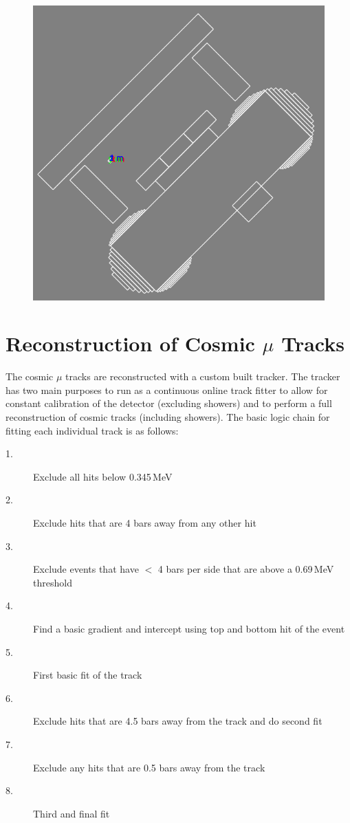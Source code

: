 \documentclass[12pt,a4paper]{article}
\begin{document}
\begin{figure}[H]
 \centering
 \includegraphics[width=0.5\linewidth]{wylfaReactorBuildings/WylfaTopDownGeomRedoCut.png}
  \label{fig:WylfaTopDownG4}
\end{figure}

\section{Reconstruction of Cosmic $\mu$ Tracks} \label{sec:ReconstructionOfCosmicMuTracks}
The cosmic $\mu$ tracks are reconstructed with a custom built tracker. The tracker has two main purposes to run as a continuous online track fitter to allow for constant calibration of the detector (excluding showers) and to perform a full reconstruction of cosmic tracks (including showers). The basic logic chain for fitting each individual track is as follows: 
\begin{description}
  \item[1.] Exclude all hits below 0.345\,MeV
  \item[2.] Exclude hits that are 4 bars away from any other hit 
  \item[3.] Exclude events that have $<$ 4 bars per side that are above a 0.69\,MeV threshold
  \item[4.] Find a basic gradient and intercept using top and bottom hit of the event
  \item[5.] First basic fit of the track 
  \item[6.] Exclude hits that are 4.5 bars away from the track and do second fit 
  \item[7.] Exclude any hits that are 0.5 bars away from the track
  \item[8.] Third and final fit 
\end{description}
\end{document}
